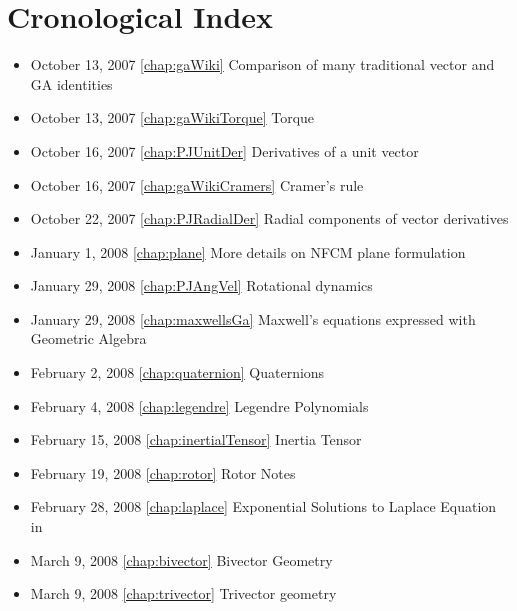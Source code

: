 \chapter{Cronological Index}
\label{chap:Cronology}

\begin{itemize}

\item October 13, 2007 \ref{chap:gaWiki} Comparison of many traditional vector and GA identities

\item October 13, 2007 \ref{chap:gaWikiTorque} Torque

\item October 16, 2007 \ref{chap:PJUnitDer} Derivatives of a unit vector

\item October 16, 2007 \ref{chap:gaWikiCramers} Cramer's rule

\item October 22, 2007 \ref{chap:PJRadialDer} Radial components of vector derivatives

\item January 1, 2008 \ref{chap:plane} More details on NFCM plane formulation

\item January 29, 2008 \ref{chap:PJAngVel} Rotational dynamics

\item January 29, 2008 \ref{chap:maxwellsGa} Maxwell's equations expressed with Geometric Algebra

\item February 2, 2008 \ref{chap:quaternion} Quaternions

\item February 4, 2008 \ref{chap:legendre} Legendre Polynomials

\item February 15, 2008 \ref{chap:inertialTensor} Inertia Tensor

\item February 19, 2008 \ref{chap:rotor} Rotor Notes

\item February 28, 2008 \ref{chap:laplace} Exponential Solutions to Laplace Equation in 

\item March 9, 2008 \ref{chap:bivector} Bivector Geometry

\item March 9, 2008 \ref{chap:trivector} Trivector geometry


\end{itemize}
